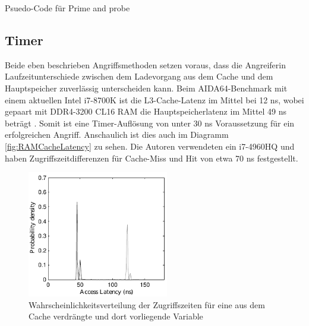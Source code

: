 
\begin{algorithm}[h]
\DontPrintSemicolon
\caption{Psuedo-Code für Prime and probe}
\label{alg:prime_and_pribe}


\end{algorithm}




\subsection{Timer}

Beide eben beschrieben Angriffsmethoden setzen voraus, dass die Angreiferin Laufzeitunterschiede zwischen dem Ladevorgang aus dem Cache und dem Hauptspeicher zuverlässig unterscheiden kann. Beim AIDA64-Benchmark mit einem aktuellen Intel i7-8700K ist die L3-Cache-Latenz im Mittel bei 12 ns, wobei gepaart mit DDR4-3200 CL16 RAM die Hauptspeicherlatenz im Mittel 49 ns beträgt \cite{i78700kLatency}. Somit ist eine Timer-Auflösung von unter 30 ns Voraussetzung für ein erfolgreichen Angriff. Anschaulich ist dies auch im Diagramm \ref{fig:RAMCacheLatency} zu sehen. Die Autoren verwendeten ein i7-4960HQ und haben Zugriffszeitdifferenzen für Cache-Miss und Hit von etwa 70 ns festgestellt. 

\label{fig:RAMCacheLatency}
\begin{figure}[h]
\centering
\includegraphics[width=0.55\textwidth]{basics/i7-4790HQ_latency_plot.pdf}
\caption{Wahrscheinlichkeitsverteilung der Zugriffszeiten für eine aus dem Cache verdrängte und dort vorliegende Variable \cite{TheSpyInTheSandbox}}
\end{figure}

